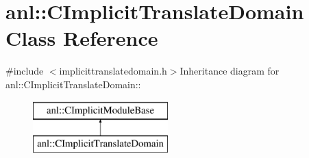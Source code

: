 \hypertarget{classanl_1_1CImplicitTranslateDomain}{
\section{anl::CImplicitTranslateDomain Class Reference}
\label{classanl_1_1CImplicitTranslateDomain}
}


{\ttfamily \#include $<$implicittranslatedomain.h$>$}Inheritance diagram for anl::CImplicitTranslateDomain::\begin{figure}[H]
\begin{center}
\leavevmode
\includegraphics[height=2cm]{classanl_1_1CImplicitTranslateDomain}
\end{center}
\end{figure}
